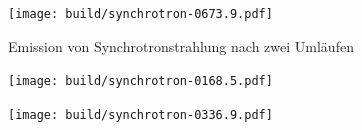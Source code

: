\documentclass[11pt,a4paper]{article}
\begin{document}
        \begin{figure}[h]
            \centering
            \texttt{[image: build/synchrotron-0673.9.pdf]}
            \caption{Emission von Synchrotronstrahlung nach zwei Umläufen}
        \end{figure}

        \begin{figure}[h]
            \centering
            \texttt{[image: build/synchrotron-0168.5.pdf]}
        \end{figure}

        \begin{figure}[h]
            \centering
            \texttt{[image: build/synchrotron-0336.9.pdf]}
        \end{figure}
\end{document}
